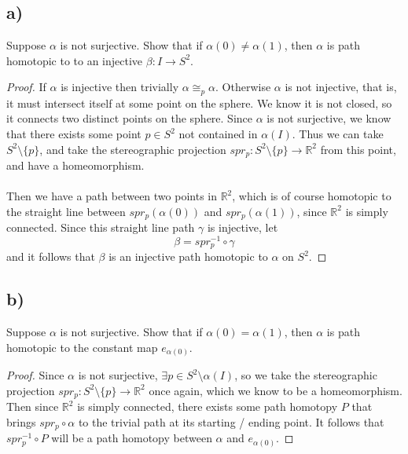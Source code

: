 \documentclass{article}
\theoremstyle{definition}
\begin{document}
\subsection*{a)}
\begin{mdframed}
    Suppose $\alpha$ is not surjective. Show that if $\alpha(0) \neq \alpha(1)$, then $\alpha$ is path homotopic to 
    to an injective $\beta:I \rightarrow S^2$.
\end{mdframed}
\begin{proof}
    If $\alpha$ is injective then trivially $\alpha \cong_p \alpha$. Otherwise $\alpha$ is not injective, that is, it must intersect itself at some point on the sphere.
    We know it is not closed, so it connects two distinct points on the sphere. Since $\alpha$ is not surjective, we know that there exists some point $p \in S^2$ not contained in $\alpha(I)$.
    Thus we can take $S^2 \setminus \{p\}$, and take the stereographic projection $spr_p : S^2 \setminus \{p\} \rightarrow \mathbb{R}^2$ from this point, and have a homeomorphism.\\\\
    Then we have a path between two points in $\mathbb{R}^2$, which is of course homotopic to the straight line between $spr_p(\alpha(0))$ and $spr_p(\alpha(1))$, since $\mathbb{R}^2$ is simply connected. 
    Since this straight line path $\gamma$ is injective, let $$\beta = spr_p^{-1} \circ \gamma$$ and it follows that $\beta$ is an injective path homotopic to $\alpha$ on $S^2$.
\end{proof}
\subsection*{b)}
\begin{mdframed}
    Suppose $\alpha$ is not surjective. Show that if $\alpha(0) = \alpha(1)$, then $\alpha$ is path homotopic to the constant map $e_{\alpha(0)}$.
\end{mdframed}
\begin{proof}
    Since $\alpha$ is not surjective, $\exists p \in S^2 \setminus \alpha(I)$, so we take the stereographic projection $spr_p: S^2 \setminus \{p\} \rightarrow \mathbb{R}^2$
    once again, which we know to be a homeomorphism. Then since $\mathbb{R}^2$ is simply connected, there exists some path homotopy $P$ that brings $spr_p \circ \alpha$ to the trivial path at its starting / ending point. 
    It follows that $spr_p^{-1} \circ P$ will be a path homotopy between $\alpha$ and $e_{\alpha(0)}$.
\end{proof}
\end{document}

